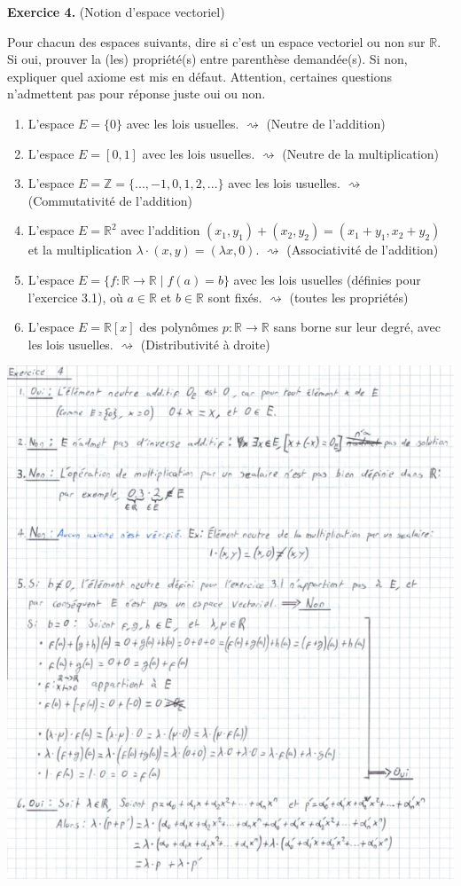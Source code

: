 \documentclass[a4paper, 10pt]{report}
\begin{document}
	\vspace{5mm}
	\noindent
	\textbf{Exercice 4.} (Notion d'espace vectoriel)
	
	\indent Pour chacun des espaces suivants, dire si c'est un espace
	vectoriel ou non sur $\mathbb{R}$. Si oui, prouver la (les)
	propriété(s) entre parenthèse demandée(s). Si non, expliquer quel
	axiome est mis en défaut. Attention, certaines questions
	n'admettent pas pour réponse juste oui ou non.
	
	\begin{enumerate}[label=\arabic*.]
		\item L'espace $E = \{0\}$ avec les lois usuelles.
			$\rightsquigarrow$ (Neutre de l'addition)
		\item L'espace $E = [0, 1]$ avec les lois usuelles.
			$\rightsquigarrow$ (Neutre de la multiplication)
		\item L'espace $E = \mathbb{Z} = \{..., -1, 0, 1, 2, ...\}$
		avec les lois usuelles.
			$\rightsquigarrow$ (Commutativité de l'addition)
		\item L'espace $E = \mathbb{R}^2$ avec
		l'addition $(x_1, y_1) + (x_2, y_2) = (x_1 + y_1, x_2 + y_2)$ et
		la multiplication $\lambda \cdot (x, y) = (\lambda x, 0)$.
			$\rightsquigarrow$ (Associativité de l'addition)
		\item L'espace $E = \{f : \mathbb{R} \rightarrow \mathbb{R} \mid f(a) = b\}$
		avec les lois usuelles (définies pour l'exercice 3.1),
		où $a \in \mathbb{R}$ et $b \in \mathbb{R}$ sont fixés.
			$\rightsquigarrow$ (toutes les propriétés)
		\item L'espace $E = \mathbb{R}[x]$ des polynômes
		$p : \mathbb{R} \rightarrow \mathbb{R}$ sans borne sur leur degré,
		avec les lois usuelles.
			$\rightsquigarrow$ (Distributivité à droite)
	\end{enumerate}
	
	
	\includegraphics{ex04.png}
\end{document}
